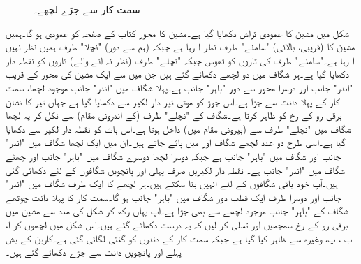 \begin{figure}
\caption{سمت کار سے جڑے لچھے۔}
\label{شکل_یکسمتی_سمتکار_سے_جڑے_لچھے}
\end{figure}


شکل  میں مشین کا عمودی تراش دکھایا گیا ہے۔مشین کا محور کتاب کے صفحہ کو عمودی ہو گا۔ہمیں مشین کا (قریبی، بالائی) "سامنے" طرف نظر آ رہا ہے جبکہ  (ہم سے دور) "نچلا"  طرف ہمیں نظر نہیں آ رہا ہے۔"سامنے" طرف کی تاروں کو ٹھوس جبکہ "نچلے" طرف (نظر نہ آنے والے) تاروں کو نقطہ دار دکھایا گیا ہے۔ہر شگاف میں دو لچھے دکھائے گئے ہیں جن میں سے ایک مشین کی محور کے قریب  "اندر" جانب اور دوسرا محور سے دور "باہر" جانب ہے۔پہلا  شگاف میں "اندر" جانب موجود لچھا، سمت کار کے پہلا  دانت سے جڑا ہے۔اس جوڑ کو موٹی تیر دار لکیر سے دکھایا گیا ہے جہاں تیر کا نشان برقی رو کے رخ کو ظاہر کرتا ہے۔شگاف  کے "نچلے" طرف (کے اندرونی مقام) سے نکل کر یہ لچھا  شگاف  میں "نچلے" طرف سے (بیرونی مقام میں) داخل ہوتا ہے۔اس بات کو نقطہ دار لکیر سے دکھایا گیا ہے۔اسی طرح دو عدد لچھے شگاف  اور  میں پائے جاتے ہیں۔ان میں ایک لچھا  شگاف   میں "اندر" جانب اور شگاف  میں "باہر" جانب ہے جبکہ دوسرا لچھا دوسرے شگاف میں "باہر"  جانب اور چھٹے شگاف میں "اندر" جانب ہے۔ نقطہ دار لکیریں صرف پہلی اور پانچویں شگافوں کے لئے دکھائی گئی ہیں۔آپ خود باقی شگافوں کے لئے انہیں بنا سکتے ہیں۔ہر لچھے کا ایک طرف شگاف میں "اندر" جانب  اور  دوسرا طرف ایک قطب دور  شگاف میں "باہر" جانب  ہو گا۔سمت کار کا  پہلا  دانت چوتھے  شگاف کے "باہر" جانب موجود لچھے سے بھی جڑا ہے۔آپ یہاں رکھ کر شکل   کی مدد سے مشین میں برقی رو کے رخ سمجھیں اور تسلی کر لیں کہ یہ درست دکھائے گئے ہیں۔اس شکل میں لچھوں کو ا، ب ، پ، وغیرہ سے ظاہر کیا گیا ہے جبکہ سمت کار کے دندوں کو گنتی لگائی گئی ہے۔کاربن کے بش پہلے اور پانچویں دانت سے جڑے دکھائے گئے ہیں۔

